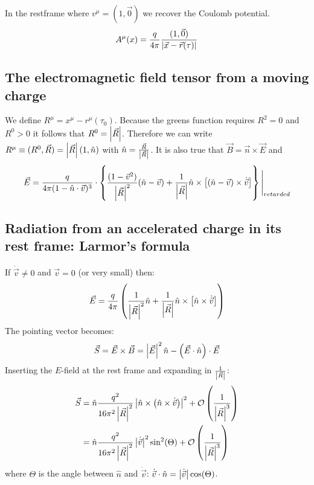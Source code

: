 In the restframe where $v^\mu = (1,\vec{0})$ we recover the Coulomb potential.
\begin{align*}
    A^\mu (x) = \frac{q}{4 \pi} \frac{(1,\vec{0})}{\left\vert \vec{x} - \vec{r}(\tau) \right\vert}
\end{align*}

\subsection{The electromagnetic field tensor from a moving charge}

We define $R^\mu = x^\mu - r^\mu (\tau_0)$. Because the greens function requires
$R^2 = 0$ and $R^0 >0$ it follows that $R^0 = \left\vert \vec{R} \right\vert$. Therefore we can
write $R^\mu \equiv (R^0 ,\vec{R}) = \left\vert \vec{R} \right\vert \left( 1 , \hat{n} \right)$ with
$\hat{n} = \frac{\vec{R}}{\left\vert \vec{R} \right\vert}$. It is also true that $\vec{B} =
\vec{n} \times \vec{E}$ and
\begin{align*}
    \vec{E} = \frac{q}{4 \pi (1-\hat{n} \cdot \vec{v})^3} \cdot
    \left\{ \frac{(1-\vec{v}^2)}{\left\vert \vec{R} \right\vert^2} (\hat{n} - \vec{v})
    + \frac{1}{\left\vert \vec{R} \right\vert} \hat{n} \times \left[ \left( \hat{n} - \vec{v} \right) \times \dot{\vec{v}} \right] \right\}
    \Bigg|_{retarded}
\end{align*}

\subsection{Radiation from an accelerated charge in its rest frame:
Larmor's formula}

If $\dot{\vec{v}} \neq 0$ and $\vec{v} = 0$ (or very small) then:
\begin{align*}
    \vec{E} = \frac{q}{4 \pi} \left( \frac{1}{\left\vert \vec{R} \right\vert^2} \hat{n} + \frac{1}{\left\vert \vec{R} \right\vert} \hat{n} \times \left[ \hat{n} \times \dot{\vec{v}} \right] \right)
\end{align*}
The pointing vector becomes:
\begin{align*}
    \vec{S} = \vec{E} \times \vec{B} =
    \left\vert \vec{E} \right\vert^2 \hat{n} - \left( \vec{E} \cdot \hat{n} \right) \cdot \vec{E}
\end{align*}
Inserting the $E$-field at the rest frame and expanding in $\frac{1}{\left\vert \vec{R} \right\vert}$:
\begin{align*}
    \vec{S} &= \hat{n} \frac{q^2}{16 \pi^2 \left\vert \vec{R} \right\vert^2} \left\vert \hat{n} \times \left( \hat{n} \times \dot{\vec{v}} \right) \right\vert^2 + \mathcal{O} \left( \frac{1}{\left\vert \vec{R} \right\vert^3} \right)
    \\
    &= \hat{n} \frac{q^2}{16 \pi^2 \left\vert \vec{R} \right\vert^2} \left\vert \dot{\vec{v}} \right\vert^2 \sin^2 (\Theta) + \mathcal{O} \left( \frac{1}{\left\vert \vec{R} \right\vert^3} \right)
\end{align*}
where $\Theta$ is the angle between $\hat{n}$ and $\dot{\vec{v}}$:
$\dot{\vec{v}} \cdot \hat{n} = \left\vert \dot{\vec{v}} \right\vert \cos(\Theta)$.

